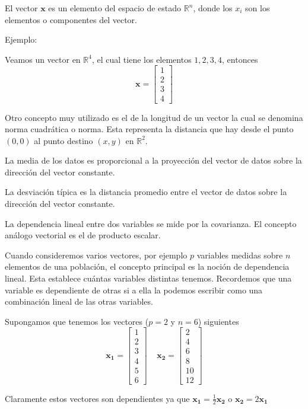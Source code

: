 \documentclass[12pt,letterpaper]{report} %
\begin{document}
El vector $\mathbf{x}$ es un elemento del espacio de estado $\mathbb{R}^n$, donde los $x_i$ son los elementos o componentes del vector.

Ejemplo:

Veamos un vector en $\mathbb{R}^4$, el cual tiene los elementos $1,2,3,4$, entonces
$$
\mathbf{x}=
\begin{bmatrix}
1 \\ 
2 \\ 
3 \\ 
4
\end{bmatrix}
$$

Otro concepto muy utilizado es el de la longitud de un vector la cual se denomina norma cuadrática o norma. Esta representa la distancia que hay desde el punto $(0,0)$ al punto destino $(x,y)$ en $\mathbb{R}^2$.

La media de los datos es proporcional a la proyección del vector de datos sobre la dirección del vector constante.

La desviación típica es la distancia promedio entre el vector de datos sobre la dirección del vector constante.

La dependencia lineal entre dos variables se mide por la covarianza. El concepto análogo vectorial es el de producto escalar.

Cuando consideremos varios vectores, por ejemplo $p$ variables medidas sobre $n$ elementos de una población, el concepto principal es la noción de dependencia lineal. Esta establece cuántas variables distintas tenemos. Recordemos que una variable es dependiente de otras si a ella la podemos escribir como una combinación lineal de las otras variables.

Supongamos que tenemos los vectores ($p=2$ y $n=6$) siguientes
$$\mathbf{x_1}=\begin{bmatrix}1\\ 2 \\ 3 \\ 4 \\ 5 \\ 6 \end{bmatrix} \ \ \ \ \  \mathbf{x_2}=\begin{bmatrix} 2 \\ 4 \\ 6 \\ 8 \\ 10 \\ 12 \end{bmatrix}$$

Claramente estos vectores son dependientes ya que $\mathbf{x_1}=\frac{1}{2}\mathbf{x_2}$ o $\mathbf{x_2}=2\mathbf{x_1}$\\
\end{document}

